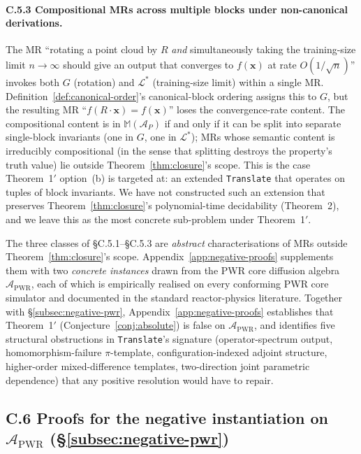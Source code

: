 \documentclass[acmsmall, screen]{acmart}
\begin{document}
\paragraph{C.5.3 Compositional MRs across multiple blocks under non-canonical derivations.}
The MR ``rotating a point cloud by $R$ \emph{and} simultaneously taking the training-size limit $n \to \infty$ should give an output that converges to $f(\mathbf{x})$ at rate $O(1/\sqrt{n})$'' invokes both $G$ (rotation) and $\mathcal{L}^*$ (training-size limit) within a single MR. Definition~\ref{def:canonical-order}'s canonical-block ordering assigns this to $G$, but the resulting MR ``$f(R\cdot\mathbf{x}) = f(\mathbf{x})$'' loses the convergence-rate content. The compositional content is in $\mathbb{M}(\mathcal{A}_P)$ if and only if it can be split into separate single-block invariants (one in $G$, one in $\mathcal{L}^*$); MRs whose semantic content is irreducibly compositional (in the sense that splitting destroys the property's truth value) lie outside Theorem~\ref{thm:closure}'s scope. This is the case Theorem~1$'$ option~(b) is targeted at: an extended \texttt{Translate} that operates on tuples of block invariants. We have not constructed such an extension that preserves Theorem~\ref{thm:closure}'s polynomial-time decidability (Theorem~2), and we leave this as the most concrete sub-problem under Theorem~1$'$.

The three classes of \S C.5.1--\S C.5.3 are \emph{abstract} characterisations of MRs outside Theorem~\ref{thm:closure}'s scope. Appendix~\ref{app:negative-proofs} supplements them with two \emph{concrete instances} drawn from the PWR core diffusion algebra $\mathcal{A}_{\mathrm{PWR}}$, each of which is empirically realised on every conforming PWR core simulator and documented in the standard reactor-physics literature. Together with \S\ref{subsec:negative-pwr}, Appendix~\ref{app:negative-proofs} establishes that Theorem~1$'$ (Conjecture~\ref{conj:absolute}) is false on $\mathcal{A}_{\mathrm{PWR}}$, and identifies five structural obstructions in \texttt{Translate}'s signature (operator-spectrum output, homomorphism-failure $\pi$-template, configuration-indexed adjoint structure, higher-order mixed-difference templates, two-direction joint parametric dependence) that any positive resolution would have to repair.

\subsection*{C.6 Proofs for the negative instantiation on $\mathcal{A}_{\mathrm{PWR}}$ (\S\ref{subsec:negative-pwr})}
\label{app:negative-proofs}
\end{document}
